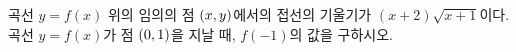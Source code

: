 곡선 $y=f(x)$ 위의 임의의 점 $(x{,}\mkern3mu\mathopen{}y)$에서의 접선의 기울기가 $(x+2)\sqrt{x+1}$이다. 곡선 $y=f(x)$가 점 $(0{,}\mkern3mu\mathopen{}1)$을 지날 때, $f(-1)$의 값을 구하시오.
